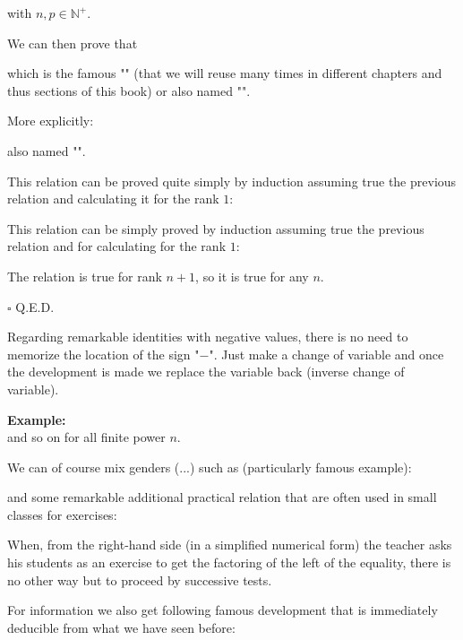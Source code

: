 	with $n,p\in \mathbb{N}^{+}$.
	\begin{theorem}
	We can then prove that\label{binomial theorem}
	
	which is the famous "" (that we will reuse many times in different chapters and thus sections of this book) or also named "".
	
	More explicitly\label{binomial coefficient development}:
	
	also named "".
	\end{theorem}
	\begin{dem}
	This relation can be proved quite simply by induction assuming true the previous relation and calculating it for the rank $1$:
	
	This relation can be simply proved by induction assuming true the previous relation and for calculating for the rank $1$:
	
	The relation is true for rank $n + 1$, so it is true for any $n$.
	\begin{flushright}
		$\square$  Q.E.D.
	\end{flushright}
	\end{dem} 
	Regarding remarkable identities with negative values, there is no need to memorize the location of the sign "$-$". Just make a change of variable and once the development is made we replace the variable back (inverse change of variable).
	\begin{tcolorbox}[colframe=black,colback=white,sharp corners]
	\textbf{{\Large {}}Example:}\\
	
	and so on for all finite power $n$.
	\end{tcolorbox}
	We can of course mix genders (...) such as (particularly famous example):
	
	and some remarkable additional practical relation that are often used in small classes for exercises:
	
	\begin{tcolorbox}[title=Remark,colframe=black,arc=10pt]
	When, from the right-hand side (in a simplified numerical form) the teacher asks his students as an exercise to get the factoring of the left of the equality, there is no other way but to proceed by successive tests.
	\end{tcolorbox}
	For information we also get following famous development that is immediately deducible from what we have seen before:
	
